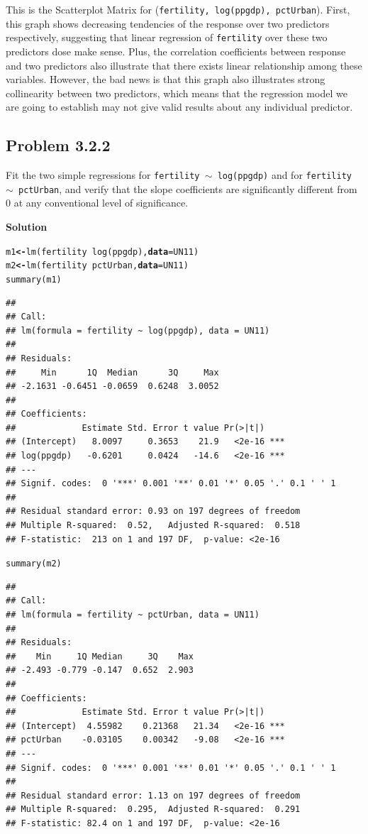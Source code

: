 \documentclass[12pt,oneside,a4paper]{article}\usepackage[]{graphicx}\usepackage[]{xcolor}
\makeatletter
\newcommand{\hlopt}[1]{\textcolor[rgb]{0,0,0}{#1}}%
\newcommand{\hlstd}[1]{\textcolor[rgb]{0,0,0}{#1}}%
\newcommand{\hlkwb}[1]{\textcolor[rgb]{0.498,0,0.333}{\textbf{#1}}}%
\newcommand{\hlkwc}[1]{\textcolor[rgb]{0.498,0,0.333}{\textbf{#1}}}%
\newcommand{\hlkwd}[1]{\textcolor[rgb]{0,0,0}{#1}}%
\newenvironment{kframe}{%
 \def\at@end@of@kframe{}%
 \ifinner\ifhmode%
  \def\at@end@of@kframe{\end{minipage}}%
  \begin{minipage}{\columnwidth}%
 \fi\fi%
 \def\FrameCommand##1{\hskip\@totalleftmargin \hskip-\fboxsep
 \colorbox{shadecolor}{##1}\hskip-\fboxsep
     \hskip-\linewidth \hskip-\@totalleftmargin \hskip\columnwidth}%
 \MakeFramed {\advance\hsize-\width
   \@totalleftmargin\z@ \linewidth\hsize
   \@setminipage}}%
 {\par\unskip\endMakeFramed%
 \at@end@of@kframe}
\newenvironment{knitrout}{}{} %
\newcommand{\subproblem}[1]
{
    \subsection*{Problem {#1}}
}
\newcommand{\solution}
{
    \vspace{15pt}
    \noindent\ignorespaces\textbf{\large Solution}
}
\newcommand{\m}[1]{\texttt{{#1}}}
\makeatother
\begin{document}
This is the Scatterplot Matrix for (\texttt{fertility, log(ppgdp), pctUrban}). First, this graph shows decreasing tendencies of the response over two predictors respectively, suggesting that linear regression of \texttt{fertility} over these two predictors dose make sense. Plus, the correlation coefficients between response and two predictors also illustrate that there exists linear relationship among these variables. However, the bad news is that this graph also illustrates strong collinearity between two predictors, which means that the regression model we are going to establish may not give valid results about any individual predictor.

\subproblem{3.2.2}
Fit the two simple regressions for \m{fertility $\sim$ log(ppgdp)} and for \m{fertility $\sim$ pctUrban}, and verify that the slope coefficients are significantly different from 0 at any conventional level of significance.

\solution
\begin{knitrout}
\color{fgcolor}\begin{kframe}
\begin{alltt}
\hlstd{m1} \hlkwb{<-} \hlkwd{lm}\hlstd{(fertility} \hlopt{~} \hlkwd{log}\hlstd{(ppgdp),} \hlkwc{data} \hlstd{= UN11)}
\hlstd{m2} \hlkwb{<-} \hlkwd{lm}\hlstd{(fertility} \hlopt{~} \hlstd{pctUrban,} \hlkwc{data} \hlstd{= UN11)}
\hlkwd{summary}\hlstd{(m1)}
\end{alltt}
\begin{verbatim}
## 
## Call:
## lm(formula = fertility ~ log(ppgdp), data = UN11)
## 
## Residuals:
##     Min      1Q  Median      3Q     Max 
## -2.1631 -0.6451 -0.0659  0.6248  3.0052 
## 
## Coefficients:
##             Estimate Std. Error t value Pr(>|t|)    
## (Intercept)   8.0097     0.3653    21.9   <2e-16 ***
## log(ppgdp)   -0.6201     0.0424   -14.6   <2e-16 ***
## ---
## Signif. codes:  0 '***' 0.001 '**' 0.01 '*' 0.05 '.' 0.1 ' ' 1
## 
## Residual standard error: 0.93 on 197 degrees of freedom
## Multiple R-squared:  0.52,	Adjusted R-squared:  0.518 
## F-statistic:  213 on 1 and 197 DF,  p-value: <2e-16
\end{verbatim}
\begin{alltt}
\hlkwd{summary}\hlstd{(m2)}
\end{alltt}
\begin{verbatim}
## 
## Call:
## lm(formula = fertility ~ pctUrban, data = UN11)
## 
## Residuals:
##    Min     1Q Median     3Q    Max 
## -2.493 -0.779 -0.147  0.652  2.903 
## 
## Coefficients:
##             Estimate Std. Error t value Pr(>|t|)    
## (Intercept)  4.55982    0.21368   21.34   <2e-16 ***
## pctUrban    -0.03105    0.00342   -9.08   <2e-16 ***
## ---
## Signif. codes:  0 '***' 0.001 '**' 0.01 '*' 0.05 '.' 0.1 ' ' 1
## 
## Residual standard error: 1.13 on 197 degrees of freedom
## Multiple R-squared:  0.295,	Adjusted R-squared:  0.291 
## F-statistic: 82.4 on 1 and 197 DF,  p-value: <2e-16
\end{verbatim}
\end{kframe}
\end{knitrout}
\end{document}
